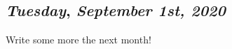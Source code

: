 \begin{center}
\section*{\month}
\end{center}

\def\day{\textit{September 1st, 2020}}
\def\weekday{\textit{Tuesday}}
\subsection*{\weekday, \day}

Write some more the next month! 